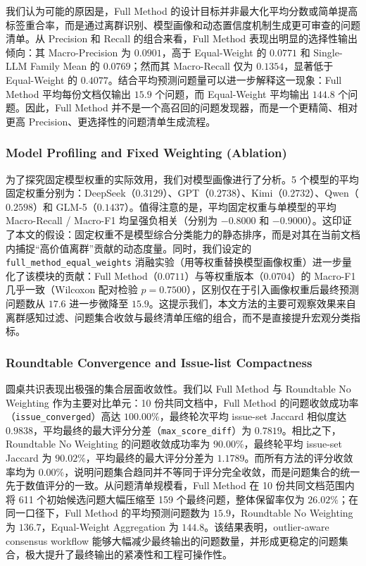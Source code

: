 \documentclass[a4paper,11pt]{ctexart}
\begin{document}
我们认为可能的原因是，Full Method 的设计目标并非最大化平均分数或简单提高标签重合率，而是通过离群识别、模型画像和动态置信度机制生成更可审查的问题清单。从 Precision 和 Recall 的组合来看，Full Method 表现出明显的选择性输出倾向：其 Macro-Precision 为 $0.0901$，高于 Equal-Weight 的 $0.0771$ 和 Single-LLM Family Mean 的 $0.0769$；然而其 Macro-Recall 仅为 $0.1354$，显著低于 Equal-Weight 的 $0.4077$。结合平均预测问题量可以进一步解释这一现象：Full Method 平均每份文档仅输出 $15.9$ 个问题，而 Equal-Weight 平均输出 $144.8$ 个问题。因此，Full Method 并不是一个高召回的问题发现器，而是一个更精简、相对更高 Precision、更选择性的问题清单生成流程。

\subsubsection{Model Profiling and Fixed Weighting (Ablation)}

为了探究固定模型权重的实际效用，我们对模型画像进行了分析。5 个模型的平均固定权重分别为：DeepSeek（$0.3129$）、GPT（$0.2738$）、Kimi（$0.2732$）、Qwen（$0.2598$）和 GLM-5（$0.1437$）。值得注意的是，平均固定权重与单模型的平均 Macro-Recall / Macro-F1 均呈强负相关（分别为 $-0.8000$ 和 $-0.9000$）。这印证了本文的假设：固定权重不是模型综合分类能力的静态排序，而是对其在当前文档内捕捉“高价值离群”贡献的动态度量。同时，我们设定的 \texttt{full\_method\_equal\_weights} 消融实验（用等权重替换模型画像权重）进一步量化了该模块的贡献：Full Method（$0.0711$）与等权重版本（$0.0704$）的 Macro-F1 几乎一致（Wilcoxon 配对检验 $p=0.7500$），区别仅在于引入画像权重后最终预测问题数从 $17.6$ 进一步微降至 $15.9$。这提示我们，本文方法的主要可观察效果来自离群感知过滤、问题集合收敛与最终清单压缩的组合，而不是直接提升宏观分类指标。

\subsubsection{Roundtable Convergence and Issue-list Compactness}
圆桌共识表现出极强的集合层面收敛性。我们以 Full Method 与 Roundtable No Weighting 作为主要对比单元：10 份共同文档中，Full Method 的问题收敛成功率（\texttt{issue\_converged}）高达 $100.00\%$，最终轮次平均 issue-set Jaccard 相似度达 $0.9838$，平均最终的最大评分分差（\texttt{max\_score\_diff}）为 $0.7819$。相比之下，Roundtable No Weighting 的问题收敛成功率为 $90.00\%$，最终轮平均 issue-set Jaccard 为 $90.02\%$，平均最终的最大评分分差为 $1.1789$。而所有方法的评分收敛率均为 $0.00\%$，说明问题集合趋同并不等同于评分完全收敛，而是问题集合的统一先于数值评分的一致。从问题清单规模看，Full Method 在 10 份共同文档范围内将 611 个初始候选问题大幅压缩至 159 个最终问题，整体保留率仅为 $26.02\%$；在同一口径下，Full Method 的平均预测问题数为 $15.9$，Roundtable No Weighting 为 $136.7$，Equal-Weight Aggregation 为 $144.8$。该结果表明，outlier-aware consensus workflow 能够大幅减少最终输出的问题数量，并形成更稳定的问题集合，极大提升了最终输出的紧凑性和工程可操作性。
\end{document}
